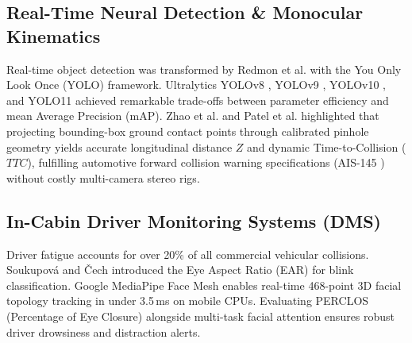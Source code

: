 \documentclass[conference]{IEEEtran}
\begin{document}
\subsection{Real-Time Neural Detection \& Monocular Kinematics}
Real-time object detection was transformed by Redmon et al. \cite{redmon2016yolo} with the You Only Look Once (YOLO) framework. Ultralytics YOLOv8 \cite{jocher2023yolov8}, YOLOv9 \cite{wang2024yolov9}, YOLOv10 \cite{wang2024yolov10}, and YOLO11 \cite{ultralytics2025yolo11} achieved remarkable trade-offs between parameter efficiency and mean Average Precision (mAP). Zhao et al. \cite{zhao2026efficient} and Patel et al. \cite{patel2024monocular} highlighted that projecting bounding-box ground contact points through calibrated pinhole geometry \cite{hartley2003multiple} yields accurate longitudinal distance $Z$ and dynamic Time-to-Collision ($TTC$), fulfilling automotive forward collision warning specifications (AIS-145 \cite{ais145_2020}) without costly multi-camera stereo rigs.

\subsection{In-Cabin Driver Monitoring Systems (DMS)}
Driver fatigue accounts for over 20\% of all commercial vehicular collisions. Soukupov{\'a} and {\v{C}}ech \cite{soukupova2016real} introduced the Eye Aspect Ratio (EAR) for blink classification. Google MediaPipe Face Mesh \cite{kartynnik2019mediapipe} enables real-time 468-point 3D facial topology tracking in under 3.5\,ms on mobile CPUs. Evaluating PERCLOS (Percentage of Eye Closure) \cite{dinges1998perclos} alongside multi-task facial attention \cite{li2024multitask} ensures robust driver drowsiness and distraction alerts.
\end{document}
